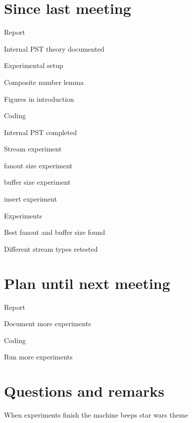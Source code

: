 \documentclass[a4paper,11pt,agenda,chair]{meetingmins}
\begin{document}
\maketitle

\section{Since last meeting}
\begin{items}
\item Report
	\begin{items}
		\item Internal PST theory documented
		\item Experimental setup
		\item Composite number lemma
		\item Figures in introduction
	\end{items}
\item Coding
	\begin{items}
		\item Internal PST completed
		\item Stream experiment
		\item fanout size experiment
		\item buffer size experiment
		\item insert experiment
	\end{items}
\item Experiments
	\begin{items}
		\item Best fanout and buffer size found
		\item Different stream types retested
	\end{items}
\end{items}

\section{Plan until next meeting}
\begin{items}
\item Report
	\begin{items}
		\item Document more experiments
	\end{items}
\item Coding
	\begin{items}
		\item Run more experiments
	\end{items}
\end{items}

\section{Questions and remarks}
\begin{items}
	\item When experiments finish the machine beeps star wars theme
\end{items}
\end{document}
